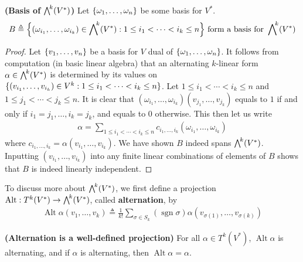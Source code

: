 \documentclass{report}
\begin{document}
\begin{theorem}
\label{Boe}
\textbf{(Basis of $\extp^k(V^*)$)} Let $\{ \omega_1,\dots ,\omega_n \}$ be some basis for $V^*$. 
 \begin{align*}
B\triangleq \bset{(\omega_{i_1},\dots ,\omega_{i_k})\in \extp^k(V^*): 1\leq i_1 <\cdots < i_k \leq n }\text{ form a basis for }\extp^k(V^*)
\end{align*}
\end{theorem}
\begin{proof}
Let $\{ v_1,\dots,v_n \}$ be a basis for $V$ dual of $\{ \omega_1,\dots ,\omega_n \}$. It follows from computation (in basic linear algebra) that an alternating $k$-linear form $\alpha \in \extp^k(V^*)$ is determined by its values on $\{ (v_{i_1},\dots ,v_{i_k})\in V^k:1\leq i_1 <\cdots <i_k\leq n \}$. Let $1\leq i_1 <\cdots < i_k\leq n$ and $1\leq j_1<\cdots <j_k\leq n$. It is clear that $(\omega_{i_1},\dots ,\omega_{i_k})(v_{j_1},\dots ,v_{j_k})$ equals to $1$ if and only if  $i_1=j_1,\dots ,i_k=j_k$, and equals to $0$ otherwise. This then let us write 
\begin{align*}
\alpha = \sum_{1\leq i_1<\cdots <i_k\leq n} c_{i_1,\dots ,i_k} (\omega_{i_1},\dots ,\omega_{i_k})
\end{align*}
where $c_{i_1,\dots ,i_k}=\alpha (v_{i_1},\dots ,v_{i_k})$. We have shown $B$ indeed spans  $\extp^k(V^*)$. Inputting $(v_{i_1},\dots ,v_{i_k})$ into any finite linear combinations of elements of $B$ shows that $B$  is indeed linearly independent. 
\end{proof}
\begin{mdframed}
To discuss more about $\extp^k (V^*)$, we first define a projection $\operatorname{Alt}:T^k(V^*)\rightarrow \extp^k(V^*)$, called \textbf{alternation}, by 
\begin{align*}
\operatorname{Alt}\alpha (v_1,\dots ,v_k) \triangleq \frac{1}{k!} \sum_{\sigma \in S_k}(\operatorname{sgn} \sigma)\alpha (v_{\sigma(1)},\dots ,v_{\sigma (k)})
\end{align*}
\end{mdframed}
\begin{theorem}
\label{Ali}
\textbf{(Alternation is a well-defined projection)} For all $\alpha \in T^k(V^*)$,  $\operatorname{Alt}\alpha $ is alternating, and if $\alpha $ is alternating, then $\operatorname{Alt}\alpha =\alpha $. 
\end{theorem}
\end{document}
